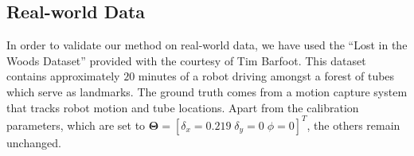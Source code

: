 
\subsection{Real-world Data}

In order to validate our method on real-world data, we have used the ``Lost in
the Woods Dataset'' provided with the courtesy of Tim Barfoot. This dataset
contains approximately $20$ minutes of a robot driving amongst a forest of
tubes which serve as landmarks. The ground truth comes from a motion capture
system that tracks robot motion and tube locations. Apart from the calibration
parameters, which are set to $\mathbf{\Theta}=[\delta_x=0.219\;\delta_y=0\;
\phi=0]^T$, the others remain unchanged.
